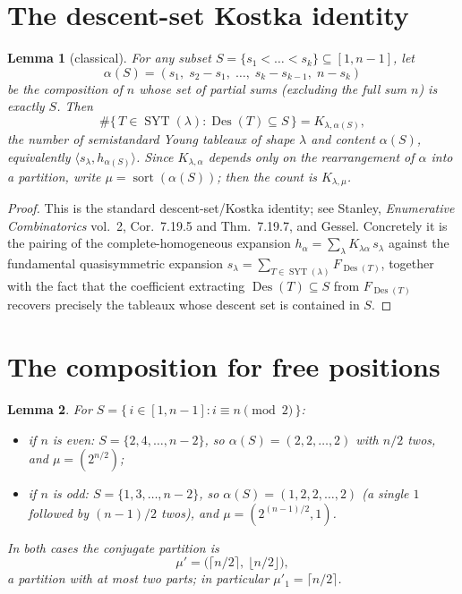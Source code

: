 \documentclass[11pt]{article}
\newtheorem{lemma}{Lemma}
\theoremstyle{remark}
\newcommand{\Des}{\operatorname{Des}}
\newcommand{\SYT}{\operatorname{SYT}}
\newcommand{\sort}{\operatorname{sort}}
\begin{document}
\section{The descent-set Kostka identity}

\begin{lemma}[classical]\label{lem:kostka}
For any subset $S=\{s_1<\dots<s_k\}\subseteq[1,n-1]$, let
\[
\alpha(S)=(s_1,\;s_2-s_1,\;\dots,\;s_k-s_{k-1},\;n-s_k)
\]
be the composition of $n$ whose set of partial sums (excluding the full sum $n$) is exactly $S$. Then
\[
\#\{\,T\in\SYT(\lambda): \Des(T)\subseteq S\,\} = K_{\lambda,\alpha(S)},
\]
the number of semistandard Young tableaux of shape $\lambda$ and content $\alpha(S)$, equivalently $\langle s_\lambda, h_{\alpha(S)}\rangle$. Since $K_{\lambda,\alpha}$ depends only on the rearrangement of $\alpha$ into a partition, write $\mu=\sort(\alpha(S))$; then the count is $K_{\lambda,\mu}$.
\end{lemma}

\begin{proof}
This is the standard descent-set/Kostka identity; see Stanley, \emph{Enumerative Combinatorics} vol.~2, Cor.~7.19.5 and Thm.~7.19.7, and Gessel. Concretely it is the pairing of the complete-homogeneous expansion $h_\alpha=\sum_\lambda K_{\lambda\alpha}\,s_\lambda$ against the fundamental quasisymmetric expansion $s_\lambda=\sum_{T\in\SYT(\lambda)} F_{\Des(T)}$, together with the fact that the coefficient extracting $\Des(T)\subseteq S$ from $F_{\Des(T)}$ recovers precisely the tableaux whose descent set is contained in $S$.
\end{proof}

\section{The composition for free positions}

\begin{lemma}\label{lem:comp}
For $S=\{\,i\in[1,n-1]: i\equiv n\pmod 2\,\}$:
\begin{itemize}
\item if $n$ is even: $S=\{2,4,\dots,n-2\}$, so $\alpha(S)=(2,2,\dots,2)$ with $n/2$ twos, and $\mu=(2^{n/2})$;
\item if $n$ is odd: $S=\{1,3,\dots,n-2\}$, so $\alpha(S)=(1,2,2,\dots,2)$ (a single $1$ followed by $(n-1)/2$ twos), and $\mu=(2^{(n-1)/2},1)$.
\end{itemize}
In both cases the conjugate partition is
\[
\mu'=\bigl(\lceil n/2\rceil,\ \lfloor n/2\rfloor\bigr),
\]
a partition with at most two parts; in particular $\mu'_1=\lceil n/2\rceil$.
\end{lemma}
\end{document}
